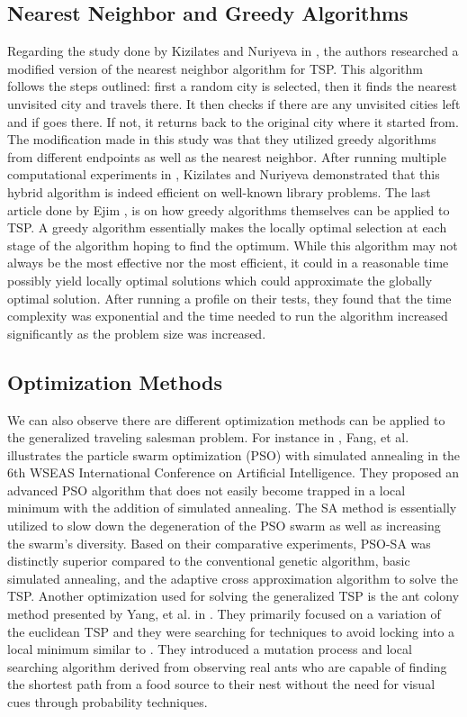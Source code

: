 \documentclass{article}
\begin{document}
\subsection{Nearest Neighbor and Greedy Algorithms}
Regarding the study done by Kizilates and Nuriyeva in \cite{kizilates}, the authors researched a modified version of the nearest neighbor algorithm for TSP. This algorithm follows the steps outlined: first a random city is selected, then it finds the nearest unvisited city and travels there. It then checks if there are any unvisited cities left and if goes there. If not, it returns back to the original city where it started from. The modification made in this study was that they utilized greedy algorithms from different endpoints as well as the nearest neighbor. After running multiple computational experiments in \cite{kizilates}, Kizilates and Nuriyeva demonstrated that this hybrid algorithm is indeed efficient on well-known library problems. The last article done by Ejim \cite{ejim}, is on how greedy algorithms themselves can be applied to TSP. A greedy algorithm essentially makes the locally optimal selection at each stage of the algorithm hoping to find the optimum. While this algorithm may not always be the most effective nor the most efficient, it could in a reasonable time possibly yield locally optimal solutions which could approximate the globally optimal solution. After running a profile on their tests, they found that the time complexity was exponential and the time needed to run the algorithm increased significantly as the problem size was increased. \\


\subsection{Optimization Methods}
We can also observe there are different optimization methods can be applied to the generalized traveling salesman problem. For instance in \cite{fang}, Fang, et al. illustrates the particle swarm optimization (PSO) with simulated annealing in the 6th WSEAS International Conference on Artificial Intelligence. They proposed an advanced PSO algorithm that does not easily become trapped in a local minimum with the addition of simulated annealing. The SA method is essentially utilized to slow down the degeneration of the PSO swarm as well as increasing the swarm's diversity. Based on their comparative experiments, PSO-SA was distinctly superior compared to the conventional genetic algorithm, basic simulated annealing, and the adaptive cross approximation algorithm to solve the TSP. Another optimization used for solving the generalized TSP is the ant colony method presented by Yang, et al. in \cite{yang}. They primarily focused on a variation of the euclidean TSP and they were searching for techniques to avoid locking into a local minimum similar to \cite{fang}. They introduced a mutation process and local searching algorithm derived from observing real ants who are capable of finding the shortest path from a food source to their nest without the need for visual cues through probability techniques. \\
\end{document}
